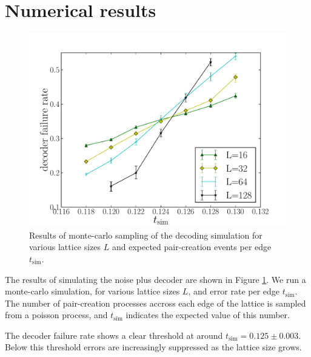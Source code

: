 \section{Numerical results}


\begin{figure}
\begin{center}
\includegraphics[width=0.8\columnwidth]{anyons-kyle.pdf}
\caption{
Results of monte-carlo sampling of the decoding simulation for
various lattice sizes $L$ and expected pair-creation events per
edge $t_{\mathrm{sim}}.$
}
\label{AnyonsKyle}
\end{center}
\end{figure}

The results of simulating the noise plus decoder are shown in
Figure \ref{AnyonsKyle}.
We run a monte-carlo simulation, for various lattice sizes $L$,
and error rate per edge $t_{\mathrm{sim}}.$
The number of pair-creation
processes accross each edge of the lattice
is sampled from a poisson process,
and $t_{\mathrm{sim}}$ indicates the expected value of this number.

The decoder failure rate shows a clear threshold at around 
$t_{\mathrm{sim}}=0.125\pm0.003.$ 
Below this threshold errors are increasingly suppressed 
as the lattice size grows.


